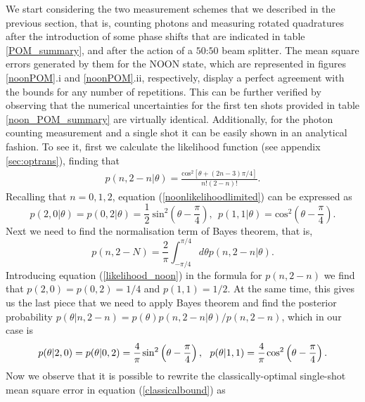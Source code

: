 We start considering the two measurement schemes that we described in the previous section, that is, counting photons and measuring rotated quadratures after the introduction of some phase shifts that are indicated in table \ref{POM_summary}, and after the action of a $50$:$50$ beam splitter. The mean square errors generated by them for the NOON state, which are represented in figures \ref{noonPOM}.i and \ref{noonPOM}.ii, respectively, display a perfect agreement with the bounds for any number of repetitions. This can be further verified by observing that the numerical uncertainties for the first ten shots provided in table \ref{noon_POM_summary} are virtually identical. Additionally, for the photon counting measurement and a single shot it can be easily shown in an analytical fashion. To see it, first we calculate the likelihood function (see appendix \ref{sec:optrans}), finding that
\begin{eqnarray}
p(n,2-n|\theta) = \frac{\mathrm{cos}^2\left[\theta + (2n-3)\pi/4\right]}{ n! (2-n)!}.
\label{noonlikelihoodlimited}
\end{eqnarray}
Recalling that $n = 0, 1, 2$, equation (\ref{noonlikelihoodlimited}) can be expressed as
\begin{equation}
p(2,0|\theta) = p(0,2|\theta) = \frac{1}{2}~\mathrm{sin}^2\left(\theta - \frac{\pi}{4}\right), ~~ p(1,1|\theta) = \mathrm{cos}^2\left(\theta - \frac{\pi}{4}\right).
\label{likelihood_noon}
\end{equation}
Next we need to find the normalisation term of Bayes theorem, that is,
\begin{equation}
p(n,2-N) = \frac{2}{\pi} \int_{-\pi/4}^{\pi/4} d\theta p(n,2-n|\theta).
\label{normalisationbayes}
\end{equation}
Introducing equation (\ref{likelihood_noon}) in the formula for $p(n,2-n)$ we find that $p(2,0) = p(0,2) = 1/4$ and $p(1,1)=1/2$. At the same time, this gives us the last piece that we need to apply Bayes theorem and find the posterior probability $p(\theta|n,2-n) = p(\theta)p(n,2-n|\theta)/p(n,2-n)$, which in our case is
\begin{equation}
p(\theta|2,0) = p(\theta|0,2) = \frac{4}{\pi}\hspace{0.1em}\mathrm{sin}^2\left(\theta - \frac{\pi}{4}\right), ~~ p(\theta|1,1) = \frac{4}{\pi}\hspace{0.1em}\mathrm{cos}^2\left(\theta - \frac{\pi}{4}\right).
\label{posterior_noon}
\end{equation}
Now we observe that it is possible to rewrite the classically-optimal single-shot mean square error in equation (\ref{classicalbound}) as
